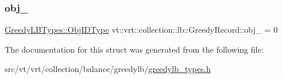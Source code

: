\mbox{\label{structvt_1_1vrt_1_1collection_1_1lb_1_1_greedy_record_ab0e01d4431f547a017c9a4887bf5d207}} 
\subsubsection{\texorpdfstring{obj\+\_\+}{obj\_}}
{\footnotesize\ttfamily \hyperlink{structvt_1_1vrt_1_1collection_1_1lb_1_1_greedy_l_b_types_a201f3d97240fe881e1ed6c0d2cfde262}{Greedy\+L\+B\+Types\+::\+Obj\+I\+D\+Type} vt\+::vrt\+::collection\+::lb\+::\+Greedy\+Record\+::obj\+\_\+ = 0\hspace{0.3cm}{\ttfamily [private]}}



The documentation for this struct was generated from the following file\+:\begin{DoxyCompactItemize}
\item 
src/vt/vrt/collection/balance/greedylb/\hyperlink{greedylb__types_8h}{greedylb\+\_\+types.\+h}\end{DoxyCompactItemize}
